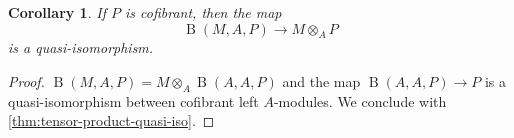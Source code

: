 \documentclass{scrartcl}
\theoremstyle{plain}
\newtheorem{theorem}{Theorem}[section]
\newtheorem{corollary}[theorem]{Corollary}
\theoremstyle{definition}
\newtheorem{remark}[theorem]{Remark}
\DeclareMathOperator{\id}{id}
\DeclareMathOperator{\BC}{B}
\begin{document}
\begin{corollary}\label{cor:bar-construction-is-derived-tensor-product}
    If $P$ is cofibrant, then the map $$\BC(M, A, P)\to M\otimes_A P$$
    is a quasi-isomorphism. 
\end{corollary}
\begin{proof}
    $\BC(M, A, P) = M\otimes_A \BC(A, A, P)$ and the map $\BC(A, A, P)\to P$ is a quasi-isomorphism between cofibrant left $A$-modules. We conclude with \cref{thm:tensor-product-quasi-iso}. 
\end{proof}


\end{document}
